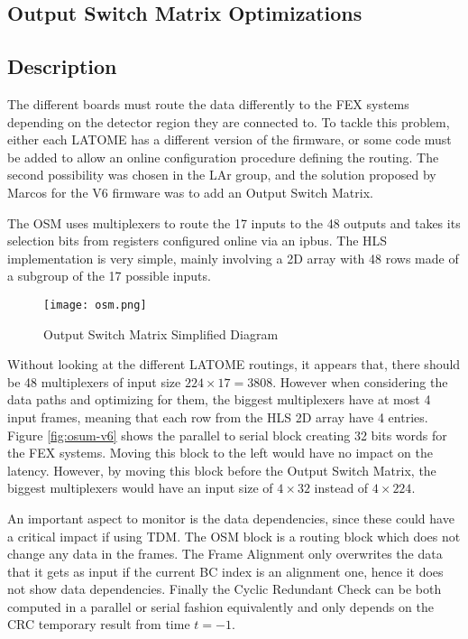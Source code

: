 \subsection{Output Switch Matrix Optimizations}\label{sec:osm}
\subsection{Description}
The different boards must route the data differently to the FEX systems depending on the detector region they are connected to. To tackle this problem, either each LATOME has a different version of the firmware, or some code must be added to allow an online configuration procedure defining the routing. The second possibility was chosen in the LAr group, and the solution proposed by Marcos for the V6 firmware was to add an Output Switch Matrix. 

The OSM uses multiplexers to route the 17 inputs to the 48 outputs and takes its selection bits from registers configured online via an ipbus. The HLS implementation is very simple, mainly involving a 2D array with 48 rows made of a subgroup of the 17 possible inputs.

\begin{figure}
    \centering
    \texttt{[image: osm.png]}
    \caption{Output Switch Matrix Simplified Diagram}
    \label{fig:original-vhdl-design}
\end{figure}

Without looking at the different LATOME routings, it appears that, there should be 48 multiplexers of input size \(224\times17=3808\).
However when considering the data paths and optimizing for them, the biggest multiplexers have at most 4 input frames, meaning that each row from the HLS 2D array have 4 entries.
Figure \ref{fig:osum-v6} shows the parallel to serial block creating 32 bits words for the FEX systems. Moving this block to the left would have no impact on the latency. However, by moving this block before the Output Switch Matrix, the biggest multiplexers would have an input size of \(4\times32\) instead of \(4\times224\).

An important aspect to monitor is the data dependencies, since these could have a critical impact if using TDM. The OSM block is a routing block which does not change any data in the frames. The Frame Alignment only overwrites the data that it gets as input if the current BC index is an alignment one, hence it does not show data dependencies. Finally the Cyclic Redundant Check can be both computed in a parallel or serial fashion equivalently and only depends on the CRC temporary result from time \(t=-1\).

